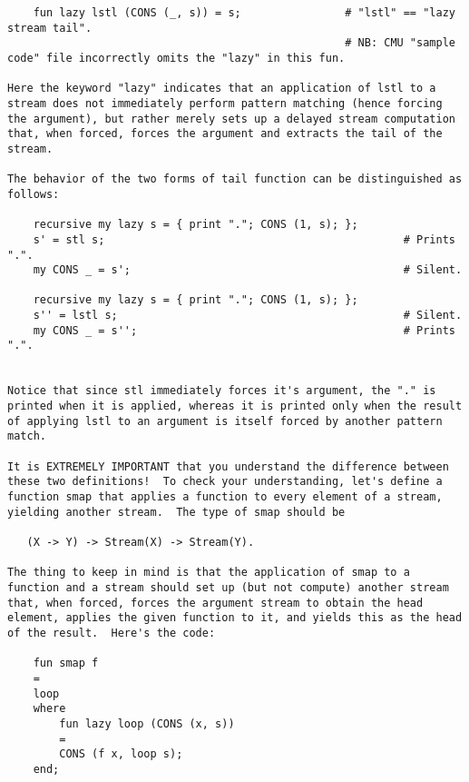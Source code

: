 \begin{verbatim}
    fun lazy lstl (CONS (_, s)) = s;                # "lstl" == "lazy stream tail". 
                                                    # NB: CMU "sample code" file incorrectly omits the "lazy" in this fun.  
  
Here the keyword "lazy" indicates that an application of lstl to a 
stream does not immediately perform pattern matching (hence forcing 
the argument), but rather merely sets up a delayed stream computation 
that, when forced, forces the argument and extracts the tail of the 
stream. 
 
The behavior of the two forms of tail function can be distinguished as 
follows: 
 
    recursive my lazy s = { print "."; CONS (1, s); };  
    s' = stl s;                                              # Prints ".".  
    my CONS _ = s';                                          # Silent. 
 
    recursive my lazy s = { print "."; CONS (1, s); };  
    s'' = lstl s;                                            # Silent. 
    my CONS _ = s'';                                         # Prints ".". 
 
 
Notice that since stl immediately forces it's argument, the "." is 
printed when it is applied, whereas it is printed only when the result 
of applying lstl to an argument is itself forced by another pattern 
match. 
 
It is EXTREMELY IMPORTANT that you understand the difference between 
these two definitions!  To check your understanding, let's define a 
function smap that applies a function to every element of a stream, 
yielding another stream.  The type of smap should be 
 
   (X -> Y) -> Stream(X) -> Stream(Y). 
 
The thing to keep in mind is that the application of smap to a 
function and a stream should set up (but not compute) another stream 
that, when forced, forces the argument stream to obtain the head 
element, applies the given function to it, and yields this as the head 
of the result.  Here's the code: 
 
    fun smap f 
	= 
	loop 
	where 
	    fun lazy loop (CONS (x, s)) 
		= 
		CONS (f x, loop s); 
	end; 
 

\end{verbatim}
